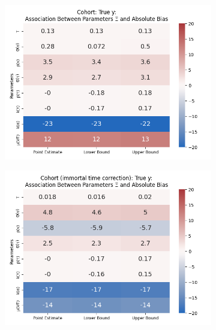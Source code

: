 \documentclass[12pt]{article}
\begin{document}
\begin{figure}[H]
	\centering
	\caption{Association Between Parameters $\Xi$ and Absolute Bias By Study Design}
	\begin{subfigure}[t]{0.23\linewidth}
		\centering
		\caption{}
		\includegraphics[scale=0.25]{VEMethod_Drivers1b_FEest_Li_MSpec_Heatmap1.png}
	\end{subfigure}
	\begin{subfigure}[t]{0.23\linewidth}
		\centering
		\caption{}
		\includegraphics[scale=0.25]{VEMethod_Drivers1b_FEest_Li_MSpec_Heatmap2.png}
	\end{subfigure}
	\begin{subfigure}[t]{0.23\linewidth}
		\centering
		\caption{}

\end{subfigure}
\end{figure}
\end{document}
